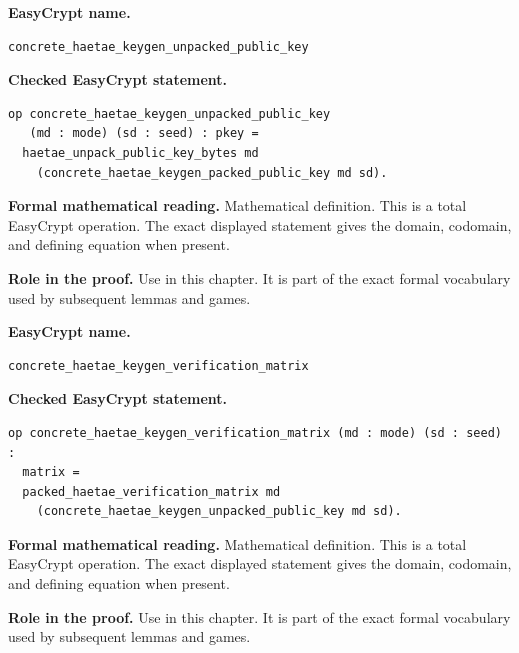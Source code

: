 \begin{formaldefinition}
\noindent\textbf{EasyCrypt name.}
\begin{lstlisting}[language=EasyCrypt,basicstyle=\ttfamily\scriptsize]
concrete_haetae_keygen_unpacked_public_key
\end{lstlisting}
\noindent\textbf{Checked EasyCrypt statement.}
\begin{lstlisting}[language=EasyCrypt,basicstyle=\ttfamily\scriptsize]
op concrete_haetae_keygen_unpacked_public_key
   (md : mode) (sd : seed) : pkey =
  haetae_unpack_public_key_bytes md
    (concrete_haetae_keygen_packed_public_key md sd).
\end{lstlisting}
\noindent\textbf{Formal mathematical reading.}
Mathematical definition. This is a total EasyCrypt operation.  The exact displayed statement gives the domain, codomain, and defining equation when present.

\noindent\textbf{Role in the proof.}
Use in this chapter. It is part of the exact formal vocabulary used by subsequent lemmas and games.

\end{formaldefinition}

\begin{formaldefinition}
\noindent\textbf{EasyCrypt name.}
\begin{lstlisting}[language=EasyCrypt,basicstyle=\ttfamily\scriptsize]
concrete_haetae_keygen_verification_matrix
\end{lstlisting}
\noindent\textbf{Checked EasyCrypt statement.}
\begin{lstlisting}[language=EasyCrypt,basicstyle=\ttfamily\scriptsize]
op concrete_haetae_keygen_verification_matrix (md : mode) (sd : seed) :
  matrix =
  packed_haetae_verification_matrix md
    (concrete_haetae_keygen_unpacked_public_key md sd).
\end{lstlisting}
\noindent\textbf{Formal mathematical reading.}
Mathematical definition. This is a total EasyCrypt operation.  The exact displayed statement gives the domain, codomain, and defining equation when present.

\noindent\textbf{Role in the proof.}
Use in this chapter. It is part of the exact formal vocabulary used by subsequent lemmas and games.

\end{formaldefinition}

